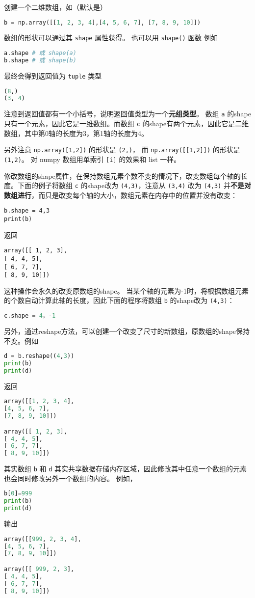创建一个二维数组，如（默认是）
\begin{lstlisting}[language=python]
b = np.array([[1, 2, 3, 4],[4, 5, 6, 7], [7, 8, 9, 10]])
\end{lstlisting}
数组的形状可以通过其 \verb|shape| 属性获得。 也可以用 \verb|shape()| 函数 例如
\begin{lstlisting}[language=python]
a.shape # 或 shape(a)
b.shape # 或 shape(b)
\end{lstlisting}
最终会得到返回值为 \verb|tuple| 类型
\begin{lstlisting}[language=python]
(8,)
(3, 4)
\end{lstlisting}
注意到返回值都有一个小括号，说明返回值类型为一个\textbf{元组类型}。 数组 \verb|a| 的shape只有一个元素，因此它是一维数组。而数组 \verb|c| 的shape有两个元素，因此它是二维数组，其中第0轴的长度为3，第1轴的长度为4。

另外注意 \verb|np.array([1,2])| 的形状是 \verb|(2,)|， 而 \verb|np.array([[1,2]])| 的形状是 \verb|(1,2)|。 对 numpy 数组用单索引 \verb|[i]| 的效果和 list 一样。

修改数组的shape属性，在保持数组元素个数不变的情况下，改变数组每个轴的长度。下面的例子将数组 \verb|c| 的shape改为 \verb|(4,3)|，注意从 \verb|(3,4)| 改为 \verb|(4,3)| 并\textbf{不是对数组进行}，而只是改变每个轴的大小，数组元素在内存中的位置并没有改变：
\begin{lstlisting}[language=none]
b.shape = 4,3
print(b)
\end{lstlisting}
返回
\begin{lstlisting}[language=none]
array([[ 1, 2, 3],
[ 4, 4, 5],
[ 6, 7, 7],
[ 8, 9, 10]])
\end{lstlisting}
这种操作会永久的改变原数组的shape。 当某个轴的元素为-1时，将根据数组元素的个数自动计算此轴的长度，因此下面的程序将数组 \verb|b| 的shape改为 \verb|(4,3)|：
\begin{lstlisting}[language=python]
c.shape = 4，-1
\end{lstlisting}
另外，通过reshape方法，可以创建一个改变了尺寸的新数组，原数组的shape保持不变。例如
\begin{lstlisting}[language=python]
d = b.reshape((4,3))
print(b)
print(d)
\end{lstlisting}
返回
\begin{lstlisting}[language=python]
array([[1, 2, 3, 4],
[4, 5, 6, 7],
[7, 8, 9, 10]])

array([[ 1, 2, 3],
[ 4, 4, 5],
[ 6, 7, 7],
[ 8, 9, 10]])
\end{lstlisting}
其实数组 \verb|b| 和 \verb|d| 其实共享数据存储内存区域，因此修改其中任意一个数组的元素也会同时修改另外一个数组的内容。 例如，
\begin{lstlisting}[language=python]
b[0]=999
print(b)
print(d)
\end{lstlisting}
输出
\begin{lstlisting}[language=python]
array([[999, 2, 3, 4],
[4, 5, 6, 7],
[7, 8, 9, 10]])

array([[ 999, 2, 3],
[ 4, 4, 5],
[ 6, 7, 7],
[ 8, 9, 10]])
\end{lstlisting}



